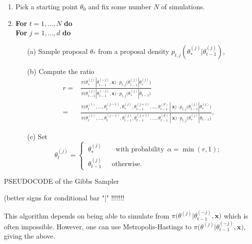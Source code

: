 \begin{algorithm}[H]
	\SetAlgoLined
	\begin{enumerate}
		\item Pick a starting point $\theta_0$ and fix some number $N$ of simulations.
		\item \textbf{For} $t=1,\dots,N$ \qquad \textbf{do} \\
		\quad \textbf{For} $j=1,\dots,d$ \qquad \textbf{do}
		\begin{itemize}
			\item[(a)] Sample proposal $\theta_*$ from a proposal density $p_{t,j}(\theta^{(j)}_*|\theta^{(j)}_{t-1})$,
			\item[(b)] Compute the ratio
			\begin{equation*}
			\begin{aligned}
				r = & \frac{\pi\Big(\theta^{(j)}_*|\theta_{t-1}^{(-j)},\boldsymbol{x}\Big)\cdot p_{t,j}\Big(\theta^{(j)}_{t-1}|\theta^{(j)}_*\Big)}{\pi\Big(\theta_{t-1}^{(j)}|\theta_{t-1}^{(-j)},\boldsymbol{x}\Big)\cdot p_{t,j}\Big(\theta^{(j)}_*|\theta_{t-1}\Big)} \\
				= & \frac{\pi\Big(\theta_t^{(1)},\dots,\theta_t^{(j-1)},\theta^{(j)}_*, \theta_{t-1}^{(j+1)},\dots,\theta_{t-1}^{(d)} \ | \ \boldsymbol{x}\Big)\cdot  p_{t,j}\Big(\theta_{t-1}^{(j)}|\theta_*^{(j)}\Big)}{\pi\Big(\theta_t^{(1)},\dots,\theta_t^{(j-1)},\theta^{(j)}_{t-1}, \theta_{t-1}^{(j+1)},\dots,\theta_{t-1}^{(d)}\ |\ \boldsymbol{x}\Big)\cdot  p_{t,j}\Big(\theta_{*}^{(j)}|\theta_{t-1}\Big)},
		\end{aligned}
			\end{equation*}
			\item[(c)] Set 
			\begin{equation*}
			\theta_t^{(j)}= 			\begin{cases} \ \theta_*^{(j)} \qquad \text{with probability} \ \  \alpha=\min (r,1); \\
			\ \theta_{t-1}^{(j)} \ \ \quad \text{otherwise}.
			\end{cases}
			\end{equation*}
		\end{itemize}
	\end{enumerate}
	\caption{PSEUDOCODE of the Gibbs Sampler}
\end{algorithm}
(better signs for conditional bar "|" !!!!!!!


This algorithm depends on being able to simulate from $\pi\Big(\theta^{(j)}|\theta_{t-1}^{(-j)},\boldsymbol{x}\Big)$ which is often impossible. However, one can use Metropolis-Hastings to $\pi\Big(\theta^{(j)}|\theta_{t-1}^{(-j)},\boldsymbol{x}\Big)$, giving the above.

